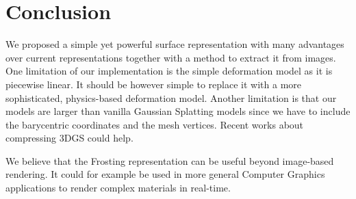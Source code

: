 \section{Conclusion}

We proposed a simple yet powerful surface representation with many advantages over current representations together with a method to extract it from images. One limitation of our implementation is the simple deformation model as it is piecewise linear. It should be however simple to replace it with a more sophisticated, physics-based deformation model. Another limitation is that our models are larger than vanilla Gaussian Splatting models since we have to include the barycentric coordinates and the mesh vertices.  Recent works about compressing 3DGS could help.

We believe that the Frosting representation can be useful beyond image-based rendering. It could for example be used in more general Computer Graphics applications to render complex materials in real-time.